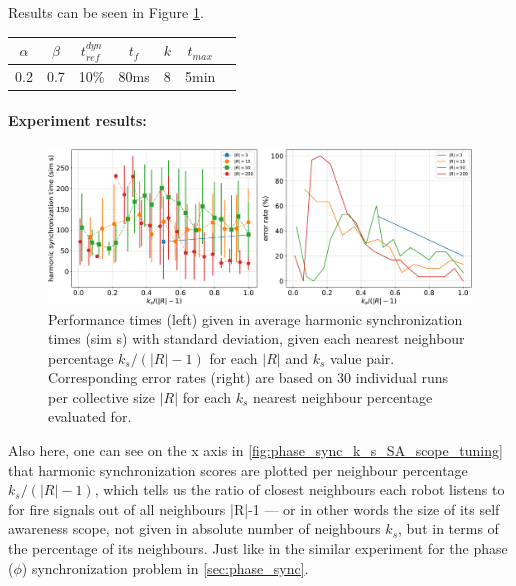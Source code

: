 				Results can be seen in Figure \ref{fig:phase_and_freq_sync_k_s_SA_scope_tuning}.

				\begin{center}
				\begin{tabular}{ |c|c|c|c|c|c|c| } 
				\hline
				$\alpha$ & $\beta$ & $t_{ref}^{dyn}$ & $t_f$ & $k$ & $t_{max}$ \\
				\hline
				0.2 & 0.7 & 10\% & 80ms & 8 & 5min \\
				\hline
				\end{tabular}
				\label{tab:phase_and_freq_sync_k_s_SA_scope_tuning}
				\end{center}

				\paragraph{Experiment results:\nl}
				
				\begin{figure}[ht!]
					\centering
					\includegraphics[width=\linewidth]{Assets/DocSegments/Chapters/ExperimentsAndResults/Figures/PerfScores/phase_and_freq_sync_k_s_SA_scope_tuning_experiment_performance.pdf}
					\caption[Experiment results for $\phi$ \& $\omega$ synchronization $k_s$ SA scope tuning experiment.]{Performance times (left) given in average harmonic synchronization times (sim s) with standard deviation, given each nearest neighbour percentage $k_s/(|R|-1)$ for each $|R|$ and $k_s$ value pair. Corresponding error rates (right) are based on 30 individual runs per collective size $|R|$ for each $k_s$ nearest neighbour percentage evaluated for.}
					\label{fig:phase_and_freq_sync_k_s_SA_scope_tuning}
				\end{figure}

				Also here, one can see on the x axis in \ref{fig:phase_sync_k_s_SA_scope_tuning} that harmonic synchronization scores are plotted per neighbour percentage $k_s/(|R|-1)$, which tells us the ratio of closest neighbours each robot listens to for fire signals out of all neighbours |R|-1 — or in other words the size of its self awareness scope, not given in absolute number of neighbours $k_s$, but in terms of the percentage of its neighbours. Just like in the similar experiment for the phase ($\phi$) synchronization problem in \ref{sec:phase_sync}.


